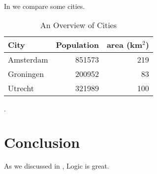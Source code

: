 \documentclass[titlepage,a4paper,11pt]{report}
\begin{document}
In  we compare some cities.

\begin{table}[H]
  \centering
  \begin{tabular}{l|rr}
    \toprule
    City & Population & area (km$^2$) \\
    \midrule
    Amsterdam & 851573 & 219 \\
    Groningen & 200952 & 83  \\
    Utrecht   & 321989 & 100 \\
    \bottomrule
  \end{tabular}
  \caption{An Overview of Cities}\label{tab:cities}.
\end{table}

\chapter{Conclusion}

As we discussed in , Logic is great.

\lipsum[40-42]

\clearpage
\printbibliography[heading=bibintoc,title=Bibliography]
\end{document}
